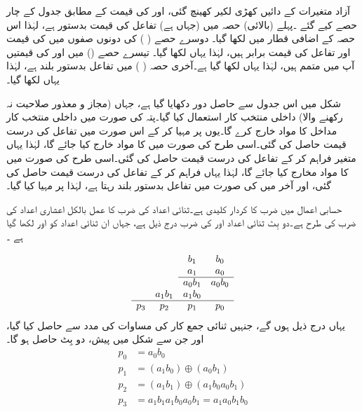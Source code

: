  آزاد متغیرات  کے دائیں کھڑی لکیر کھینچ گئی، اور  کی قیمت کے مطابق جدول کے چار حصے کیے گئے ۔پہلے (بالائی) حصہ میں (جہاں ہے) تفاعل  کی قیمت بدستور  ہے، لہٰذا اس حصہ کے اضافی قطار میں  لکھا گیا۔ دوسرے حصے ( ) کی دونوں صفوں میں  کی قیمت اور تفاعل  کی قیمت برابر ہیں، لہٰذا یہاں  لکھا گیا۔ تیسرے حصے () میں  اور  کی قیمتیں آپ میں متمم ہیں، لہٰذا یہاں  لکھا گیا ہے۔آخری حصہ ( ) میں تفاعل بدستور بلند ہے، لہٰذا یہاں  لکھا گیا۔


شکل  میں اس جدول سے حاصل دور دکھایا گیا ہے، جہاں (مجاز و معذور صلاحیت نہ رکھنے والا)  داخلی منتخب کار استعمال کیا گیا۔پتہ  کی صورت میں داخلی منتخب کار مداخل  کا مواد خارج کرے گا۔یوں  پر  مہیا کر کے اس صورت میں تفاعل کی درست قیمت حاصل کی گئی۔اسی طرح  کی صورت میں  کا مواد خارج کیا جائے گا، لہٰذا یہاں متغیر  فراہم کر کے تفاعل کی درست قیمت حاصل کی گئی۔اسی طرح  کی صورت میں  کا مواد مخارج کیا جائے گا، لہٰذا یہاں  فراہم کر کے تفاعل کی درست قیمت حاصل کی گئی، اور آخر میں  کی صورت میں تفاعل بدستور بلند رہتا ہے، لہٰذا  پر  مہیا کیا گیا۔


حسابی اعمال میں ضرب کا کردار کلیدی ہے۔ثنائی اعداد کی ضرب کا عمل بالکل اعشاری اعداد کی ضرب کی طرح ہے۔دو بِٹ ثنائی اعداد  اور  کی ضرب درج ذیل ہے، جہاں ان ثنائی اعداد کو  اور  لکھا گیا ہے ۔

\begin{align*}
\begin{array}{cccc}
&& b_1&b_0\\
&& a_1&a_0\\
\cline{3-4}
&& a_0b_1&a_0b_0\\
&a_1b_1&a_1b_0&\\
\cline{1-4}
p_3&p_2&p_1&p_0
\end{array}
\end{align*}
یہاں درج ذیل ہوں گے، جنہیں ثنائی جمع کار کی مساوات  کی مدد سے حاصل کیا گیا، اور جن سے شکل  میں پیش، دو بِٹ  حاصل ہو گا۔
\begin{align*}
p_0&=a_0b_0\\
p_1&=(a_1b_0)\oplus(a_0b_1)\\
p_2&=(a_1b_1)\oplus(a_1b_0a_0b_1)\\
p_3&=a_1b_1a_1b_0a_0b_1=a_1a_0b_1b_0
\end{align*}


